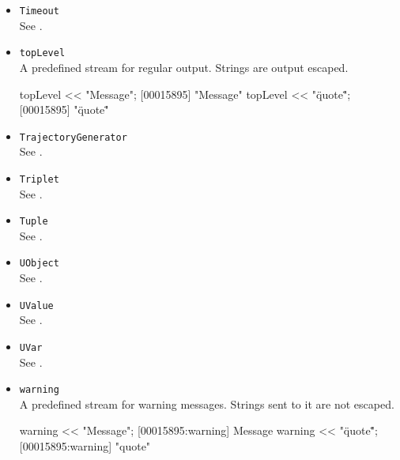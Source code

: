 \begin{itemize}
\item \lstinline|Timeout|\\
  See .

\item \lstinline|topLevel|\\
  A predefined stream for regular output.  Strings are output escaped.
\begin{urbiscript}
topLevel << "Message";
[00015895] "Message"
topLevel << "\"quote\"";
[00015895] "\"quote\""
\end{urbiscript}

\item \lstinline|TrajectoryGenerator|\\
  See .

\item \lstinline|Triplet|\\
  See .

\item \lstinline|Tuple|\\
  See .

\item \lstinline|UObject|\\
  See .

\item \lstinline|UValue|\\
  See .

\item \lstinline|UVar|\\
  See .


\item \lstinline|warning|\\
  A predefined stream for warning messages.  Strings sent to it are
  not escaped.
\begin{urbiscript}
warning << "Message";
[00015895:warning] Message
warning << "\"quote\"";
[00015895:warning] "quote"
\end{urbiscript}



\end{itemize}

